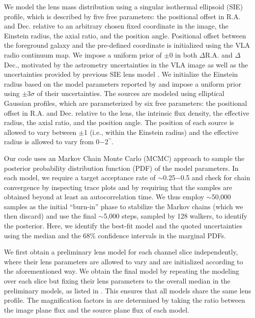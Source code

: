 \documentclass[]{emulateapj}
\begin{document}
We model the lens mass distribution using a singular isothermal
ellipsoid (SIE) profile, which is described by five free parameters: the
positional offset in R.A. and Dec. relative to an arbitrary chosen
fixed coordinate in the image, the Einstein radius, the axial ratio, and the
position angle.
Positional offset between the foreground galaxy and the pre-defined coordinate is initialized
using the VLA radio continuum map.
We impose a
uniform prior of $\pm$0 in both $\Delta$R.A. and $\Delta$Dec.,
motivated by the astrometry uncertainties in the VLA image as well as
the uncertainties provided by previous SIE lens model .
We initialize the Einstein radius based on the model parameters reported by 
and impose a uniform prior using $\pm$3$\sigma$ of their uncertainties.
The sources are modeled using elliptical Gaussian profiles, which are
parameterized by six free parameters: the positional offset in R.A.
and Dec. relative to the lens, the intrinsic flux density, the effective
radius, the axial ratio, and the position angle. The position of each source
is allowed to vary between $\pm$1 (i.e., within the Einstein radius)
and the effective radius is allowed to vary from 0$-$2$^{\prime\prime}$.

Our code uses an Markov Chain Monte Carlo (MCMC) approach to sample the
posterior probability distribution function (PDF) of the model parameters.
In each model, we require a target acceptance rate of $\sim$0.25$-$0.5
and check for chain convergence by inspecting trace plots
and by requiring that the samples are obtained beyond at least an autocorrelation time.
We thus employ $\sim$50,000 samples as the initial ``burn-in'' phase
to stabilize the Markov chains (which we then discard) and
use the final $\sim$5,000 steps, sampled by 128 walkers, to identify
the posterior. Here, we
identify the best-fit model and the quoted uncertainties using the
median and the 68\% confidence intervals in the marginal PDFs.



We first obtain a preliminary lens model for each channel slice independently,
where their lens parameters are allowed to vary and are initialized according
to the aforementioned way. We obtain the final model
by repeating the modeling over each slice but fixing their lens parameters
to the overall median in the preliminary models,
as listed in .
This ensures that all models share the same lens profile.
The magnification factors in  are determined by taking the ratio
between the image plane flux and the source plane flux of each model.
\end{document}
